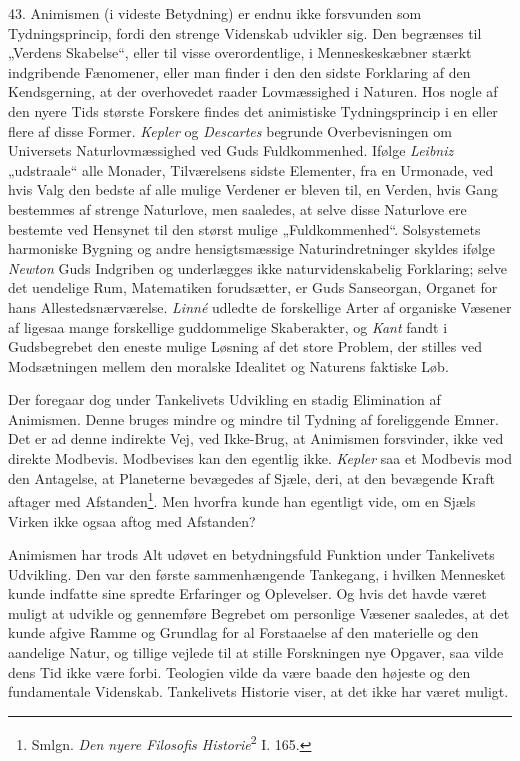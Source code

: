 \documentclass[12pt,a4paper]{book}
\newcommand{\apage}[1]{\marginnote{\footnotesize\textit{[#1]}}}
\begin{document}
43. Animismen (i videste Betydning) er endnu ikke forsvunden som
Tydningsprincip, fordi den strenge Videnskab udvikler sig. Den begrænses
til „Verdens Skabelse“, eller til visse overordentlige, i
Menneskeskæbner stærkt indgribende Fænomener, eller man finder i den den
sidste Forklaring af den Kendsgerning, at der overhovedet raader
Lovmæssighed i Naturen. Hos nogle af den nyere Tids største Forskere
findes det animistiske Tydningsprincip i en eller flere af disse Former.
\emph{Kepler} og \emph{Descartes} begrunde Overbevisningen om Universets
Naturlovmæssighed ved Guds Fuldkommenhed. Ifølge \emph{Leibniz}
„udstraale“ alle Monader, Tilværelsens sidste Elementer, fra en
Urmonade, ved hvis Valg den bedste af alle mulige Verdener er bleven
til, en Verden, hvis Gang bestemmes af strenge Naturlove, men saaledes,
at selve disse Naturlove ere bestemte ved Hensynet til den størst mulige
„Fuldkommenhed“. Solsystemets harmoniske Bygning og andre
hensigtsmæssige Naturindretninger skyldes ifølge \emph{Newton} Guds
Indgriben og underlægges ikke naturvidenskabelig Forklaring; selve det
uendelige Rum, Matematiken forudsætter, er Guds Sanseorgan, \apage{117} Organet for
hans Allestedsnærværelse. \emph{Linné} udledte de forskellige Arter af
organiske Væsener af ligesaa mange forskellige guddommelige Skaberakter,
og \emph{Kant} fandt i Gudsbegrebet den eneste mulige Løsning af det
store Problem, der stilles ved Modsætningen mellem den moralske
Idealitet og Naturens faktiske Løb.

Der foregaar dog under Tankelivets Udvikling en stadig Elimination af
Animismen. Denne bruges mindre og mindre til Tydning af foreliggende
Emner. Det er ad denne indirekte Vej, ved Ikke-Brug, at Animismen
forsvinder, ikke ved direkte Modbevis. Modbevises kan den egentlig ikke.
\emph{Kepler} saa et Modbevis mod den Antagelse, at Planeterne
bevægedes af Sjæle, deri, at den bevægende Kraft aftager med
Afstanden\footnote{Smlgn. \emph{Den nyere Filosofis
Historie}\textsuperscript{2} I. 165.}. Men hvorfra kunde han egentligt
vide, om en Sjæls Virken ikke ogsaa aftog med Afstanden?

Animismen har trods Alt udøvet en betydningsfuld Funktion under
Tankelivets Udvikling. Den var den første sammenhængende Tankegang, i
hvilken Mennesket kunde indfatte sine spredte Erfaringer og Oplevelser.
Og hvis det havde været muligt at udvikle og gennemføre Begrebet om
personlige Væsener saaledes, at det kunde afgive Ramme og Grundlag for
al Forstaaelse af den materielle og den aandelige Natur, og tillige
vejlede til at stille Forskningen nye Opgaver, saa vilde dens Tid ikke
være forbi. Teologien vilde da være baade den højeste og den
fundamentale Videnskab. Tankelivets Historie viser, at det ikke har
været muligt.
\end{document}
